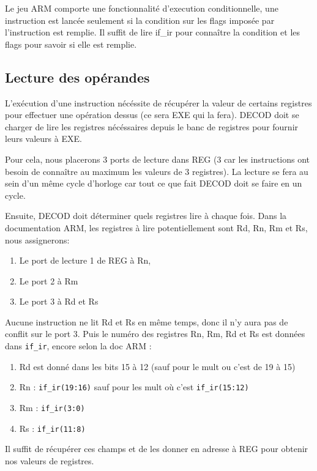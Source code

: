 \documentclass{article}
\begin{document}
Le jeu ARM comporte une fonctionnalité d'execution conditionnelle,
une instruction est lancée seulement si la condition sur les flags imposée
par l'instruction est remplie. Il suffit de lire if\_ir pour connaître la condition
et les flags pour savoir si elle est remplie.



\subsection{Lecture des opérandes}

L'exécution d'une instruction nécéssite de récupérer la valeur de certains registres pour
effectuer une opération dessus (ce sera EXE qui la fera). DECOD doit se charger
de lire les registres nécéssaires depuis le banc de registres pour fournir leurs valeurs à EXE.

Pour cela, nous placerons 3 ports de lecture dans REG (3 car les instructions ont besoin de
connaître au maximum les valeurs de 3 registres). La lecture se fera au sein d'un même cycle d'horloge
car tout ce que fait DECOD doit se faire en un cycle.

Ensuite, DECOD doit déterminer quels registres lire à chaque fois.
Dans la documentation ARM, les registres à lire potentiellement sont Rd, Rn, Rm et Rs,
nous assignerons:
\begin{enumerate}
  \item Le port de lecture 1 de REG     à Rn,
  \item Le port 2 à Rm
  \item Le port 3 à Rd et Rs
\end{enumerate}
Aucune instruction ne lit Rd et Rs en même temps, donc il n'y aura pas de conflit sur le port 3.
Puis le numéro des registres Rn, Rm, Rd et Rs est données dans \texttt{if\_ir}, encore selon la doc ARM :
\begin{enumerate}
  \item Rd est donné dans les bits 15 à 12 (sauf pour le mult ou c'est de 19 à 15)
  \item Rn : \texttt{if\_ir(19:16)} sauf pour les mult où c'est \texttt{if\_ir(15:12)}
  \item Rm : \texttt{if\_ir(3:0)}
  \item Rs : \texttt{if\_ir(11:8)}
\end{enumerate}
Il suffit de récupérer ces champs et de les donner en adresse à REG pour obtenir nos valeurs de registres.
\end{document}
